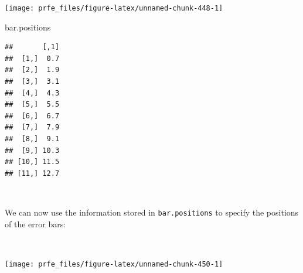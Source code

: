 \documentclass[12pt,a4paper]{book}
\newenvironment{Shaded}{\begin{snugshade}}{\end{snugshade}}
\newcommand{\KeywordTok}[1]{\textcolor[rgb]{0.13,0.29,0.53}{\textbf{#1}}}
\newcommand{\DataTypeTok}[1]{\textcolor[rgb]{0.13,0.29,0.53}{#1}}
\newcommand{\DecValTok}[1]{\textcolor[rgb]{0.00,0.00,0.81}{#1}}
\newcommand{\FloatTok}[1]{\textcolor[rgb]{0.00,0.00,0.81}{#1}}
\newcommand{\StringTok}[1]{\textcolor[rgb]{0.31,0.60,0.02}{#1}}
\newcommand{\OperatorTok}[1]{\textcolor[rgb]{0.81,0.36,0.00}{\textbf{#1}}}
\newcommand{\NormalTok}[1]{#1}
\theoremstyle{definition}
\theoremstyle{definition}
\theoremstyle{definition}
\theoremstyle{remark}
\begin{document}
\begin{Shaded}
\end{Shaded}

\begin{center}\texttt{[image: prfe\_files/figure-latex/unnamed-chunk-448-1]} \end{center}

\begin{Shaded}
\begin{Highlighting}[]
\NormalTok{bar.positions}
\end{Highlighting}
\end{Shaded}

\begin{verbatim}
##       [,1]
##  [1,]  0.7
##  [2,]  1.9
##  [3,]  3.1
##  [4,]  4.3
##  [5,]  5.5
##  [6,]  6.7
##  [7,]  7.9
##  [8,]  9.1
##  [9,] 10.3
## [10,] 11.5
## [11,] 12.7
\end{verbatim}

~

We can now use the information stored in \texttt{bar.positions} to
specify the positions of the error bars:

~

\begin{Shaded}
\end{Shaded}

\newpage

\begin{center}\texttt{[image: prfe\_files/figure-latex/unnamed-chunk-450-1]} \end{center}
\end{document}
